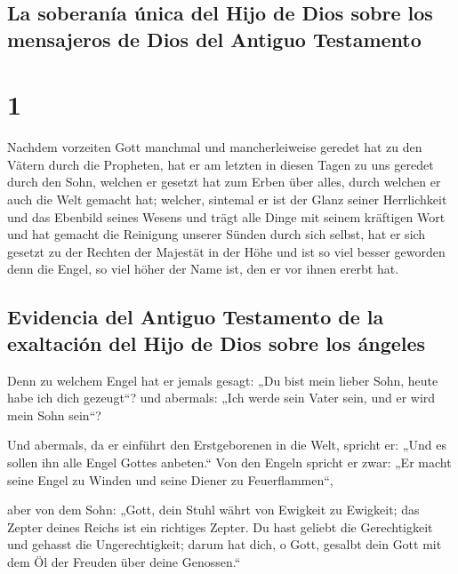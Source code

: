 \hypertarget{la-soberanuxeda-uxfanica-del-hijo-de-dios-sobre-los-mensajeros-de-dios-del-antiguo-testamento}{%
\subsection{La soberanía única del Hijo de Dios sobre los mensajeros de
Dios del Antiguo
Testamento}\label{la-soberanuxeda-uxfanica-del-hijo-de-dios-sobre-los-mensajeros-de-dios-del-antiguo-testamento}}

\hypertarget{section}{%
\section{1}\label{section}}

 Nachdem vorzeiten Gott manchmal und mancherleiweise
geredet hat zu den Vätern durch die Propheten,  hat er am
letzten in diesen Tagen zu uns geredet durch den Sohn, welchen er
gesetzt hat zum Erben über alles, durch welchen er auch die Welt gemacht
hat;  welcher, sintemal er ist der Glanz seiner
Herrlichkeit und das Ebenbild seines Wesens und trägt alle Dinge mit
seinem kräftigen Wort und hat gemacht die Reinigung unserer Sünden durch
sich selbst, hat er sich gesetzt zu der Rechten der Majestät in der Höhe
 und ist so viel besser geworden denn die Engel, so viel
höher der Name ist, den er vor ihnen ererbt hat.

\hypertarget{evidencia-del-antiguo-testamento-de-la-exaltaciuxf3n-del-hijo-de-dios-sobre-los-uxe1ngeles}{%
\subsection{Evidencia del Antiguo Testamento de la exaltación del Hijo
de Dios sobre los
ángeles}\label{evidencia-del-antiguo-testamento-de-la-exaltaciuxf3n-del-hijo-de-dios-sobre-los-uxe1ngeles}}

 Denn zu welchem Engel hat er jemals gesagt: „Du bist mein
lieber Sohn, heute habe ich dich gezeugt``? und abermals: „Ich werde
sein Vater sein, und er wird mein Sohn sein``?

 Und abermals, da er einführt den Erstgeborenen in die
Welt, spricht er: „Und es sollen ihn alle Engel Gottes anbeten.``
 Von den Engeln spricht er zwar: „Er macht seine Engel zu
Winden und seine Diener zu Feuerflammen``,

 aber von dem Sohn: „Gott, dein Stuhl währt von Ewigkeit
zu Ewigkeit; das Zepter deines Reichs ist ein richtiges Zepter.
 Du hast geliebt die Gerechtigkeit und gehasst die
Ungerechtigkeit; darum hat dich, o Gott, gesalbt dein Gott mit dem Öl
der Freuden über deine Genossen.``

